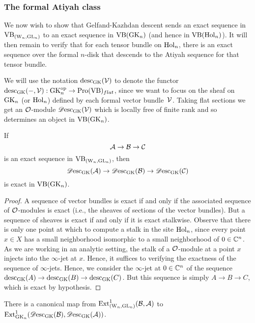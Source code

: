 \documentclass[10pt]{amsart}
\begin{document}
\subsubsection{The formal Atiyah class}

We now wish to show that Gelfand-Kazhdan descent sends an exact sequence in ${\rm VB}_{({{\rm W}_n}, {\rm GL}_n)}$ to an exact sequence in ${\rm VB}({\rm GK}_n)$ (and hence in ${\rm VB}({\rm Hol}_n)$). 
It will then remain to verify that for each tensor bundle on ${\rm Hol}_n$, 
there is an exact sequence over the formal $n$-disk that descends to the Atiyah sequence for that tensor bundle.

We will use the notation ${\rm desc}_{\rm GK}(\mathcal{V})$ to denote the functor ${\rm desc}_{\rm GK}(-,\mathcal{V}): {\rm GK}_n^{{\rm op}} \to {\rm Pro}({\rm VB})_{flat}$, 
since we want to focus on the sheaf on ${\rm GK}_n$ (or ${\rm Hol}_n$) defined
by each formal vector bundle~$\mathcal{V}$. Taking flat sections we get an
$\mathcal O$-module $\mathscr{D}{\rm esc}_{{\rm GK}}(\mathcal{V})$ which is locally free of finite
rank and so determines an object in ${\rm VB}({\rm GK}_n)$. 

\begin{lem}
If $$\mathcal A \to \mathcal B \to \mathcal C$$ is an exact sequence in ${\rm VB}_{({{\rm W}_n}, {\rm GL}_n)}$, then 
$$\mathscr{D}{\rm esc}_{\rm GK}(\mathcal A) \to \mathscr{D}{\rm esc}_{\rm GK}(\mathcal B) \to \mathscr{D}{\rm esc}_{\rm GK}(\mathcal C)$$ 
is exact in ${\rm VB}({\rm GK}_n)$.
\end{lem}

\begin{proof}
A sequence of vector bundles is exact if and only if the associated
sequence of $\mathcal O$-modules is exact (i.e., the sheaves of sections of
the vector bundles). But a sequence of sheaves is exact if and only if
it is exact stalkwise. Observe that there is only one point at which
to compute a stalk in the site ${\rm Hol}_n$, since every point $x \in X$
has a small neighborhood isomorphic to a small neighborhood of $0 \in
\mathbb C^n$. As we are working in an analytic setting, the stalk of a
$\mathcal O$-module at a point $x$ injects into the $\infty$-jet at
$x$. Hence, it suffices to verifying the exactness of the sequence of
$\infty$-jets. Hence, we consider the $\infty$-jet at $0 \in \mathbb C^n$ of
the sequence ${\rm desc}_{\rm GK}(A) \to {\rm desc}_{\rm GK}(B) \to {\rm desc}_{\rm GK}(C)$. But
this sequence is simply $A \to B \to C$, which is exact by
hypothesis.
\end{proof}

\begin{cor}
There is a canonical map from ${\rm Ext}^1_{({{\rm W}_n}, {\rm GL}_n)}(\mathcal B,\mathcal A)$ to ${\rm Ext}^1_{{\rm GK}_n}(\mathscr{D}{\rm esc}_{\rm GK}(\mathcal B), \mathscr{D}{\rm esc}_{\rm GK}(\mathcal A))$.
\end{cor}
\end{document}
